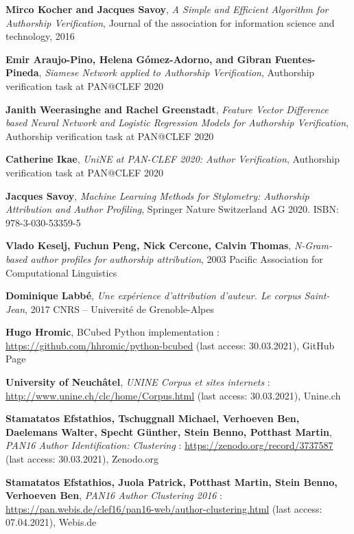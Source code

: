 \begin{thebibliography}{9}
\textbf{Mirco Kocher and Jacques Savoy},
\textit{A Simple and Efficient Algorithm for Authorship Verification},
Journal of the association for information science and technology, 2016

\textbf{Emir Araujo-Pino, Helena Gómez-Adorno, and Gibran Fuentes-Pineda},
\textit{Siamese Network applied to Authorship Verification},
Authorship verification task at PAN@CLEF 2020

\textbf{Janith Weerasinghe and Rachel Greenstadt},
\textit{Feature Vector Difference based Neural Network and Logistic Regression Models for Authorship Verification},
Authorship verification task at PAN@CLEF 2020

\textbf{Catherine Ikae},
\textit{UniNE at PAN-CLEF 2020: Author Verification},
Authorship verification task at PAN@CLEF 2020

\textbf{Jacques Savoy},
\textit{Machine Learning Methods for Stylometry: Authorship Attribution and Author Profiling},
Springer Nature Switzerland AG 2020. ISBN: 978-3-030-53359-5

\textbf{Vlado Keselj, Fuchun Peng, Nick Cercone, Calvin Thomas},
\textit{N-Gram-based author profiles for authorship attribution},
2003 Pacific Association for Computational Linguistics

\textbf{Dominique Labbé},
\textit{Une expérience d’attribution d’auteur. Le corpus Saint-Jean},
2017 CNRS – Université de Grenoble-Alpes


\textbf{Hugo Hromic},
BCubed Python implementation : \url{https://github.com/hhromic/python-bcubed} (last access: 30.03.2021),
GitHub Page

\textbf{University of Neuchâtel},
\textit{UNINE Corpus et sites internets} : \url{http://www.unine.ch/clc/home/Corpus.html} (last access: 30.03.2021),
Unine.ch

\textbf{Stamatatos Efstathios, Tschuggnall Michael, Verhoeven Ben, Daelemans Walter, Specht Günther, Stein Benno, Potthast Martin},
\textit{PAN16 Author Identification: Clustering} : \url{https://zenodo.org/record/3737587} (last access: 30.03.2021),
Zenodo.org

\textbf{Stamatatos Efstathios, Juola Patrick, Potthast Martin, Stein Benno, Verhoeven Ben},
\textit{PAN16 Author Clustering 2016} : \url{https://pan.webis.de/clef16/pan16-web/author-clustering.html} (last access: 07.04.2021),
Webis.de


\end{thebibliography}
